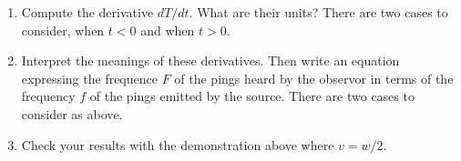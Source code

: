 \documentclass{ximera}
\begin{document}
\begin{example}
\begin{enumerate}
\item Compute the derivative $dT/dt$. What are their units? There are two cases to consider, when $t<0$ and when $t>0$.

\item Interpret the meanings of these derivatives. Then write an equation expressing the frequence $F$ of the pings heard by the observor in terms of the frequency $f$ of the pings emitted by the source. There are two cases to consider as above. 

\item Check your results with the demonstration above where $v=w/2$.

\end{enumerate}

\end{example}
\end{document}
